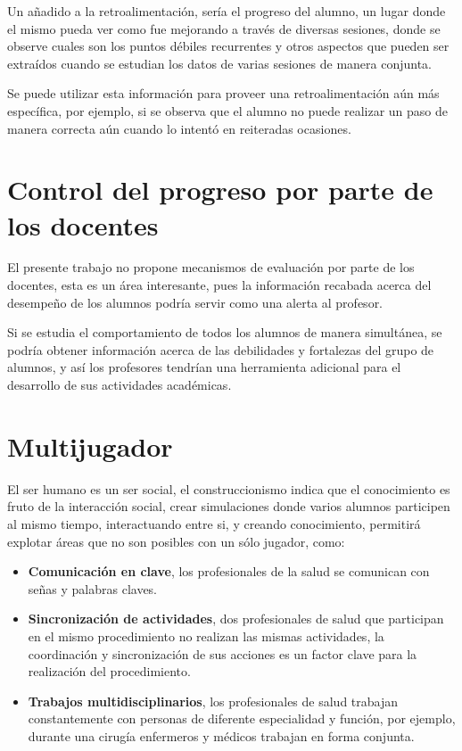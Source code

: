 Un añadido a la retroalimentación, sería el progreso del alumno, un lugar donde el
mismo pueda ver como fue mejorando a través de diversas sesiones, donde se
observe cuales son los puntos débiles recurrentes y otros aspectos que pueden
ser extraídos cuando se estudian los datos de varias sesiones de manera conjunta. 

Se puede utilizar esta información para proveer una retroalimentación aún más
específica, por ejemplo, si se observa que el alumno no puede realizar un
paso de manera correcta aún cuando lo intentó en reiteradas ocasiones.

\section{Control del progreso por parte de los docentes}

El presente trabajo no propone mecanismos de evaluación por parte de los
docentes, esta es un área interesante, pues la información recabada acerca 
del desempeño de los alumnos podría servir como una alerta al profesor.

Si se estudia el comportamiento de todos los alumnos de manera simultánea, se
podría obtener información acerca de las debilidades y fortalezas del grupo de
alumnos, y así los profesores tendrían una herramienta adicional para el
desarrollo de sus actividades académicas.

\section{Multijugador}

El ser humano es un ser social, el construccionismo indica que el conocimiento
es fruto de la interacción social, crear simulaciones donde varios alumnos
participen al mismo tiempo, interactuando entre si, y creando conocimiento,
permitirá explotar áreas que no son posibles con un sólo jugador, como:

\begin{itemize}
    \item \textbf{Comunicación en clave}, los profesionales de la salud se comunican con
        señas y palabras claves.
    \item \textbf{Sincronización de actividades}, dos profesionales de salud que
        participan en el mismo procedimiento no realizan las mismas actividades,
        la coordinación y sincronización de sus acciones es un factor clave para
        la realización del procedimiento.
    \item \textbf{Trabajos multidisciplinarios}, los profesionales de salud trabajan
        constantemente con personas de diferente especialidad y función, por
        ejemplo, durante una cirugía enfermeros y médicos trabajan en forma
        conjunta.
\end{itemize}

